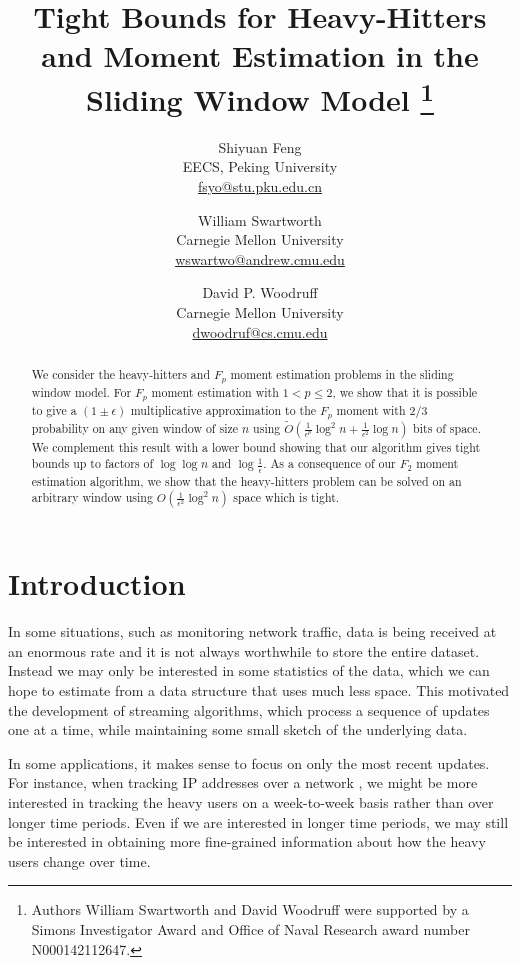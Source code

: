 \documentclass{article}
\title{Tight Bounds for Heavy-Hitters and Moment Estimation in the Sliding Window Model
\thanks{Authors William Swartworth and David Woodruff were supported by a Simons Investigator Award and Office of Naval Research award number N000142112647.}}
\theoremstyle{plain}
\begin{document}
\author{Shiyuan Feng
\\EECS, Peking University\\ \href{mailt:fsyo@stu.pku.edu.cn}{fsyo@stu.pku.edu.cn}
\and
William Swartworth \\Carnegie Mellon University\\ 
\href{mailt:wswartwo@andrew.cmu.edu}{wswartwo@andrew.cmu.edu}
\and David P. Woodruff \\Carnegie Mellon University\\
\href{mailt:dwoodruf@cs.cmu.edu}{dwoodruf@cs.cmu.edu}
}
\date{}

\maketitle

\begin{abstract}
We consider the heavy-hitters and $F_p$ moment estimation problems in the sliding window model.  For $F_p$ moment estimation with $1<p\leq 2$, we show that it is possible to give a $(1\pm \epsilon)$ multiplicative approximation to the $F_p$ moment with $2/3$ probability on any given window of size $n$ using $\tilde{O}(\frac{1}{\epsilon^p}\log^2 n + \frac{1}{\epsilon^2}\log n)$ bits of space.  We complement this result with a lower bound showing that our algorithm gives tight bounds up to factors of $\log\log n$ and $\log\frac{1}{\epsilon}.$  As a consequence of our $F_2$ moment estimation algorithm, we show that the heavy-hitters problem can be solved on an arbitrary window using $O(\frac{1}{\epsilon^2}\log^2 n)$ space which is tight. \end{abstract}

\section{Introduction}
In some situations, such as monitoring network traffic, data is being received at an enormous rate and it is not always worthwhile to store the entire dataset. Instead we may only be interested in some statistics of the data, which we can hope to estimate from a data structure that uses much less space.  This motivated the development of streaming algorithms, which process a sequence of updates one at a time, while maintaining some small sketch of the underlying data.

In some applications, it makes sense to focus on only the most recent updates.  For instance, when tracking IP addresses over a network \cite{sen2002analyzing, demaine2002frequency}, we might be more interested in tracking the heavy users on a week-to-week basis rather than over longer time periods. Even if we are interested in longer time periods, we may still be interested in obtaining more fine-grained information about how the heavy users change over time.
\end{document}
